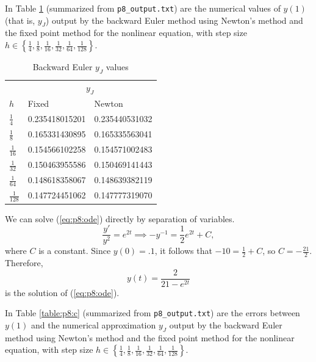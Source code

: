 \documentclass{homework}
\begin{document}
\begin{alphaparts}
		
		
		
		\questionpart 
		In Table \ref{table:p8:b} (summarized from \verb*|p8_output.txt|) are the numerical values of $y(1)$ (that is, $y_J$) output by the backward Euler method using Newton's method and the fixed point method for the nonlinear equation, with step size $h \in \left\{\frac{1}{4}, \frac{1}{8}, \frac{1}{16}, \frac{1}{32}, \frac{1}{64}, \frac{1}{128}\right\}$.
		\begin{table}[H]
			\centering
			\begin{tabular}{@{}lll@{}}
				\toprule
				& \multicolumn{2}{c}{$y_J$} \\
				\cmidrule{2-3}
				$h$ & Fixed & Newton \\
				\midrule
				$\frac{1}{4}$ & 0.235418015201 & 0.235440531032 \\[0.4em]
				$\frac{1}{8}$ & 0.165331430895 & 0.165335563041 \\[0.4em]
				$\frac{1}{16}$ & 0.154566102258 & 0.154571002483 \\[0.4em]
				$\frac{1}{32}$ & 0.150463955586 & 0.150469141443 \\[0.4em]
				$\frac{1}{64}$ & 0.148618358067 & 0.148639382119 \\[0.4em]
				$\frac{1}{128}$ & 0.147724451062 & 0.147777319070 \\[0.4em]
				\bottomrule
			\end{tabular}
			\caption{Backward Euler $y_J$ values}
			\label{table:p8:b}
		\end{table}
		
		\questionpart
		We can solve (\ref{eq:p8:ode}) directly by separation of variables.
		\begin{equation}
			\frac{y'}{y^2} = e^{2t} \implies -y^{-1} = \frac{1}{2}e^{2t} + C,
		\end{equation}
		where $C$ is a constant. Since $y(0) = .1$, it follows that $-10 = \frac{1}{2} + C$, so $C = -\frac{21}{2}$. Therefore,
		\begin{equation}
			y(t) = \frac{2}{21- e^{2t}}
		\end{equation}
		is the solution of (\ref{eq:p8:ode}).
		
		In Table \ref{table:p8:c} (summarized from \verb*|p8_output.txt|) are the errors between $y(1)$ and the numerical approximation $y_J$ output by the backward Euler method using Newton's method and the fixed point method for the nonlinear equation, with step size $h \in \left\{\frac{1}{4}, \frac{1}{8}, \frac{1}{16}, \frac{1}{32}, \frac{1}{64}, \frac{1}{128}\right\}$.
		

\end{alphaparts}
\end{document}
